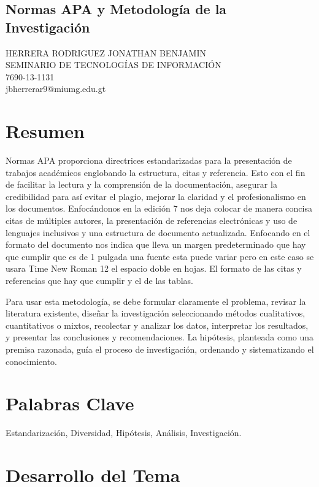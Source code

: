 \documentclass[12pt]{article}
\begin{document}
\begin{center}
\section*{Normas APA y Metodología de la Investigación}
HERRERA RODRIGUEZ JONATHAN BENJAMIN
\\SEMINARIO DE TECNOLOGÍAS DE INFORMACIÓN
\\7690-13-1131
\\jbherrerar9@miumg.edu.gt
\end{center}
\section*{Resumen}

Normas APA proporciona directrices estandarizadas para la presentación de trabajos académicos englobando la estructura, citas y referencia. Esto con el fin de facilitar la lectura y la comprensión de la documentación, asegurar la credibilidad para así evitar el plagio, mejorar la claridad y el profesionalismo en los documentos. Enfocándonos en la edición 7 nos deja colocar de manera concisa citas de múltiples autores, la presentación de referencias electrónicas y uso de lenguajes inclusivos y una estructura de documento actualizada. Enfocando en el formato del documento nos indica que lleva un margen predeterminado que hay que cumplir que es de 1 pulgada una fuente esta puede variar pero en este caso se usara Time New Roman 12 el espacio doble en hojas. El formato de las citas y referencias que hay que cumplir y el de las tablas.

Para usar esta metodología, se debe formular claramente el problema, revisar la literatura existente, diseñar la investigación seleccionando métodos cualitativos, cuantitativos o mixtos, recolectar y analizar los datos, interpretar los resultados, y presentar las conclusiones y recomendaciones. La hipótesis, planteada como una premisa razonada, guía el proceso de investigación, ordenando y sistematizando el conocimiento.

\section*{Palabras Clave}
Estandarización, Diversidad, Hipótesis, Análisis, Investigación.

\section*{Desarrollo del Tema}
\end{document}
